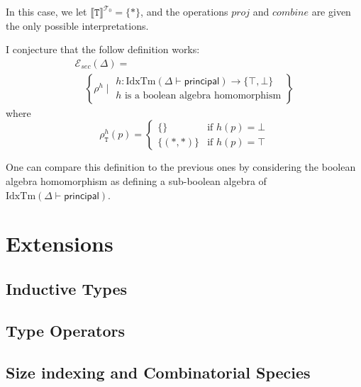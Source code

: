 \documentclass[natbib,preprint]{sigplanconf}
\newcommand{\sepbar}{\mathrel|}
\newcommand{\idxTms}[2]{\mathrm{IdxTm}(#1 \vdash #2)}
\newcommand{\tyPrimNm}[1]{\texttt{#1}}
\newcommand{\relEnv}[1]{\mathcal{#1}}
\newcommand{\tyPrimSem}[1]{\llbracket \tyPrimNm{#1} \rrbracket^{\mathcal{T}_0}}
\begin{document}
In this case, we let $\tyPrimSem{T} = \{*\}$, and the operations
$\mathit{proj}$ and $\mathit{combine}$ are given the only possible
interpretations.

I conjecture that the follow definition works:
\begin{displaymath}
  \begin{array}{l}
    \relEnv{E}_{\mathit{sec}}(\Delta) = \\
    \quad\left\{ \rho^{h} \sepbar
      \begin{array}{l}
        h : \idxTms{\Delta}{\mathsf{principal}} \to \{\top,\bot\} \\
        h\textrm{ is a boolean algebra homomorphism}
      \end{array}
    \right\}
  \end{array}
\end{displaymath}
where
\begin{displaymath}
  \rho^{h}_{\tyPrimNm{T}}(p) = \left\{
    \begin{array}{ll}
      \{\} & \textrm{if }h(p) = \bot \\
      \{(*,*) \} & \textrm{if }h(p) = \top
    \end{array}
  \right.
\end{displaymath}

One can compare this definition to the previous ones by considering
the boolean algebra homomorphism as defining a sub-boolean algebra of
$\idxTms{\Delta}{\mathsf{principal}}$.

\section{Extensions}

\subsection{Inductive Types}

\subsection{Type Operators}

\subsection{Size indexing and Combinatorial Species}
\end{document}
